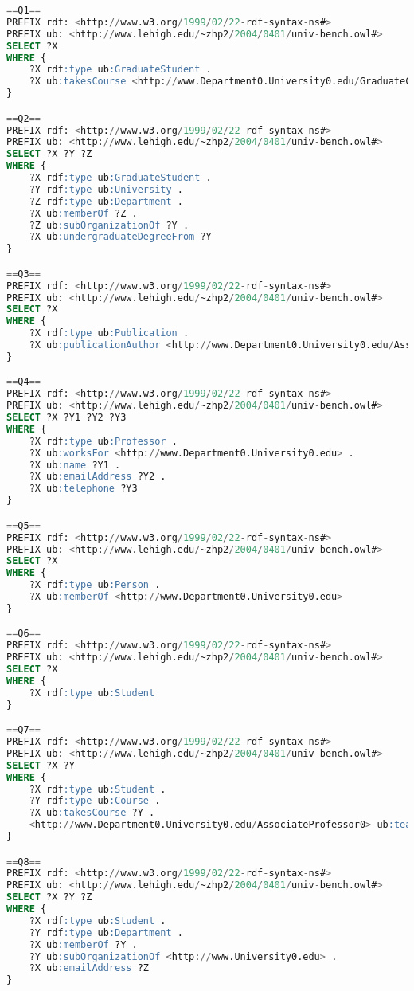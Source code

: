 \begin{lstlisting}[language=SQL, basicstyle=\ttfamily\scriptsize,morekeywords={PREFIX,OPTIONAL,FILTER,java,rdf,rdfs,url},breaklines=true,showstringspaces=false,label=lubm-sparql-queries,basewidth=0.5em]
==Q1==
PREFIX rdf: <http://www.w3.org/1999/02/22-rdf-syntax-ns#>
PREFIX ub: <http://www.lehigh.edu/~zhp2/2004/0401/univ-bench.owl#>
SELECT ?X  
WHERE {
    ?X rdf:type ub:GraduateStudent .
    ?X ub:takesCourse <http://www.Department0.University0.edu/GraduateCourse0> .
}

==Q2==
PREFIX rdf: <http://www.w3.org/1999/02/22-rdf-syntax-ns#>
PREFIX ub: <http://www.lehigh.edu/~zhp2/2004/0401/univ-bench.owl#>
SELECT ?X ?Y ?Z
WHERE {
    ?X rdf:type ub:GraduateStudent .
    ?Y rdf:type ub:University .
    ?Z rdf:type ub:Department .
    ?X ub:memberOf ?Z .
    ?Z ub:subOrganizationOf ?Y .
    ?X ub:undergraduateDegreeFrom ?Y
}

==Q3==
PREFIX rdf: <http://www.w3.org/1999/02/22-rdf-syntax-ns#>
PREFIX ub: <http://www.lehigh.edu/~zhp2/2004/0401/univ-bench.owl#>
SELECT ?X
WHERE {
    ?X rdf:type ub:Publication .
    ?X ub:publicationAuthor <http://www.Department0.University0.edu/AssistantProfessor0>
}

==Q4==
PREFIX rdf: <http://www.w3.org/1999/02/22-rdf-syntax-ns#>
PREFIX ub: <http://www.lehigh.edu/~zhp2/2004/0401/univ-bench.owl#>
SELECT ?X ?Y1 ?Y2 ?Y3
WHERE {
    ?X rdf:type ub:Professor .
    ?X ub:worksFor <http://www.Department0.University0.edu> .
    ?X ub:name ?Y1 .
    ?X ub:emailAddress ?Y2 .
    ?X ub:telephone ?Y3
}

==Q5==
PREFIX rdf: <http://www.w3.org/1999/02/22-rdf-syntax-ns#>
PREFIX ub: <http://www.lehigh.edu/~zhp2/2004/0401/univ-bench.owl#>
SELECT ?X
WHERE {
    ?X rdf:type ub:Person .
    ?X ub:memberOf <http://www.Department0.University0.edu>
}

==Q6==
PREFIX rdf: <http://www.w3.org/1999/02/22-rdf-syntax-ns#>
PREFIX ub: <http://www.lehigh.edu/~zhp2/2004/0401/univ-bench.owl#>
SELECT ?X
WHERE {
    ?X rdf:type ub:Student
}

==Q7==
PREFIX rdf: <http://www.w3.org/1999/02/22-rdf-syntax-ns#>
PREFIX ub: <http://www.lehigh.edu/~zhp2/2004/0401/univ-bench.owl#>
SELECT ?X ?Y
WHERE {
    ?X rdf:type ub:Student .
    ?Y rdf:type ub:Course .
    ?X ub:takesCourse ?Y .
    <http://www.Department0.University0.edu/AssociateProfessor0> ub:teacherOf ?Y
}

==Q8==
PREFIX rdf: <http://www.w3.org/1999/02/22-rdf-syntax-ns#>
PREFIX ub: <http://www.lehigh.edu/~zhp2/2004/0401/univ-bench.owl#>
SELECT ?X ?Y ?Z
WHERE {
    ?X rdf:type ub:Student .
    ?Y rdf:type ub:Department .
    ?X ub:memberOf ?Y .
    ?Y ub:subOrganizationOf <http://www.University0.edu> .
    ?X ub:emailAddress ?Z
}


\end{lstlisting}
